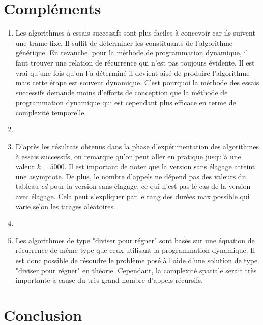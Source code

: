 \documentclass[a4paper, titlepage]{article}
\begin{document}
\section{Compléments}
\begin{enumerate}
\item
	Les algorithmes à essais successifs sont plus faciles à concevoir car ils suivent une trame fixe.
	Il suffit de déterminer les constituants de l'algorithme générique.
	En revanche, pour la méthode de programmation dynamique, il faut trouver une relation de récurrence qui n'est pas toujours évidente.
	Il est vrai qu'une fois qu'on l'a déterminé il devient aisé de produire l'algorithme mais cette étape est souvent dynamique.
	C'est pourquoi la méthode des essais successifs demande moins d'efforts de conception que la méthode de programmation dynamique qui est cependant plus efficace en terme de complexité temporelle.
\item
\item
	D'après les résultats obtenus dans la phase d'expérimentation des algorithmes à essais successifs, on remarque qu'on peut aller en pratique jusqu'à une valeur $k = 5000$.
	Il est important de noter que la version sans élagage atteint une asymptote.
	De plus, le nombre d'appels ne dépend pas des valeurs du tableau \emph{cd} pour la version sans élagage, ce qui n'est pas le cas de la version avec élagage.
	Cela peut s'expliquer par le rang des durées max possible qui varie selon les tirages aléatoires.
\item
\item
	Les algorithmes de type "diviser pour régner" sont basés sur une équation de récurrence de même type que ceux utilisant la programmation dynamique.
	Il est donc possible de résoudre le problème posé à l'aide d'une solution de type "diviser pour régner" en théorie.
	Cependant, la complexité spatiale serait très importante à cause du très grand nombre d'appels récursifs.
\end{enumerate}

\section{Conclusion}
\end{document}
